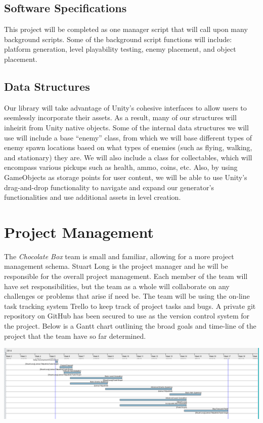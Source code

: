 \documentclass[pdftex,12pt,letter]{article}
\begin{document}
\begin{itemize}
\begin{itemize}
\begin{itemize}
\subsection{Software Specifications}
This project will be completed as one manager script that will call upon many background scripts. Some of the background script functions will include: platform generation, level playability testing, enemy placement, and object placement.
\subsection{Data Structures}
Our library will take advantage of Unity's cohesive interfaces to allow users to seemlessly incorporate their assets. As a result, many of our structures will inheirit from  Unity native objects. Some of the internal data structures we will use will include a base “enemy” class, from which we will base different types of enemy spawn locations based on what types of enemies (such as flying, walking, and stationary) they are. We will also include a class for collectables, which will encompass various pickups such as health, ammo, coins, etc. Also, by using GameObjects as storage points for user content, we will be able to use Unity's drag-and-drop functionality to navigate and expand our generator's functionalities and use additional assets in level creation.

\section{Project Management}
The \textit{Chocolate Box} team is small and familiar, allowing for a more project management schema. Stuart Long is the project manager and he will be responsible for the overall project management. Each member of the team will have set responsibilities, but the team as a whole will collaborate on any challenges or problems that arise if need be. The team will be using the on-line task tracking system Trello to keep track of project tasks and bugs. A private git repository on GitHub has been secured to use as the version control system for the project. Below is a Gantt chart outlining the broad goals and time-line of the project that the team have so far determined.\\[.5cm]
\centerline{\includegraphics[width=7in]{GanttSS.png}}


\end{itemize}
\end{itemize}
\end{itemize}
\end{document}
